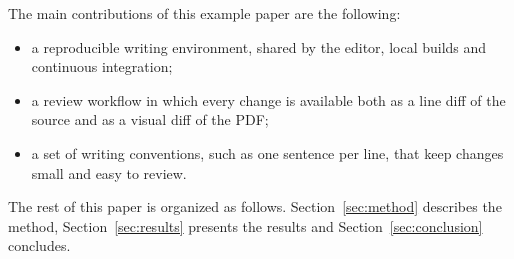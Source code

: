 The main contributions of this example paper are the following:
\begin{itemize}
  \item a reproducible writing environment, shared by the editor, local builds and continuous integration;
  \item a review workflow in which every change is available both as a line diff of the source and as a visual diff of the PDF;
  \item a set of writing conventions, such as one sentence per line, that keep changes small and easy to review.
\end{itemize}

The rest of this paper is organized as follows.
Section~\ref{sec:method} describes the method, Section~\ref{sec:results} presents the results and Section~\ref{sec:conclusion} concludes.
